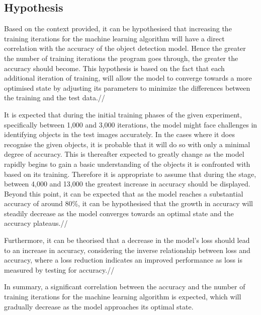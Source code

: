 \subsection{Hypothesis}
Based on the context provided, it can be hypothesised that increasing the training iterations for the machine learning algorithm will have a direct correlation with the accuracy of the object detection model. Hence the greater the number of training iterations the program goes through, the greater the accuracy should become. This hypothesis is based on the fact that each additional iteration of training, will allow the model to converge towards a more optimised state by adjusting its parameters to minimize the differences between the training and the test data.//

It is expected that during the initial training phases of the given experiment, specifically between 1,000 and 3,000 iterations, the model might face challenges in identifying objects in the test images accurately. In the cases where it does recognise the given objects, it is probable that it will do so with only a minimal degree of accuracy. This is thereafter expected to greatly change as the model rapidly begins to gain a basic understanding of the objects it is confronted with based on its training. Therefore it is appropriate to assume that during the stage, between  4,000 and 13,000 the greatest increase in accuracy should be displayed.  Beyond this point, it can be expected that as the model reaches a substantial accuracy of around 80\%, it can be hypothesised that the growth in accuracy will steadily decrease as the model converges towards an optimal state and the accuracy plateaus.//

Furthermore, it can be theorised that a decrease in the model's loss should lead to an increase in accuracy, considering the inverse relationship between loss and accuracy, where a loss reduction indicates an improved performance as loss is measured by testing for accuracy.//

In summary, a significant correlation between the accuracy and the number of training iterations for the machine learning algorithm is expected, which will gradually decrease as the model approaches its optimal state.


